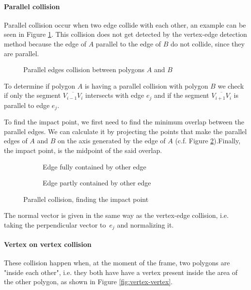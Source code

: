 \paragraph{Parallel collision} Parallel collision occur when two edge collide
with each other, an example can be seen in Figure \ref{fig:vertex-parallel}.
This collision does not get detected by the vertex-edge detection method because
the edge of $A$ parallel to the edge of $B$ do not collide, since they are
parallel.

\begin{figure}[H]
	\centering
	\caption{Parallel edges collision between polygons $A$ and $B$}
	\label{fig:vertex-parallel}
\end{figure}

To determine if polygon $A$ is having a parallel collision with polygon $B$ we
check if only the segment $\overline{V_{i-1}V_i}$ intersects with edge $e_j$ and
if the segment $\overline{V_{i+1}V_i}$ is parallel to edge $e_j$.

To find the impact point, we first need to find the minimum overlap between the
parallel edges. We can calculate it by projecting the points that make the
parallel edges of $A$ and $B$ on the axis generated by the edge of $A$ (c.f.
Figure \ref{fig:parallel-impact}).Finally, the impact point, is the midpoint of
the said overlap.

\begin{figure}[H]
	\centering
	\begin{subfigure}[]{.5\textwidth}
		\centering
		\caption{Edge fully contained by other edge}
	\end{subfigure}
	\begin{subfigure}[]{.49\textwidth}
		\centering
		\caption{Edge partly contained by other edge}
	\end{subfigure}
	\caption{Parallel collision, finding the impact point}
	\label{fig:parallel-impact}
\end{figure}

The normal vector is given in the same way as the vertex-edge collision, i.e.
taking the perpendicular vector to~$e_j$ and normalizing it.

\paragraph{Vertex on vertex collision} These collision happen when, at the
moment of the frame, two polygons are "inside each other", i.e. they both have
have a vertex present inside the area of the other polygon, as shown in Figure
\ref{fig:vertex-vertex}.

